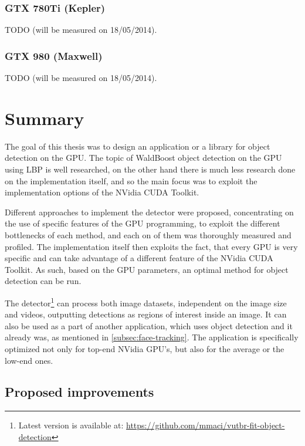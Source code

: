 \clearpage

\subsection{GTX 780Ti (Kepler)}

TODO (will be measured on 18/05/2014).

\subsection{GTX 980 (Maxwell)}

TODO (will be measured on 18/05/2014).

\chapter{Summary}

The goal of this thesis was to design an application or a library for object detection on the GPU. The topic of WaldBoost object detection on the GPU using LBP is well researched, on the other hand there is much less research done on the implementation itself, and so the main focus was to exploit the implementation options of the NVidia CUDA Toolkit.

Different approaches to implement the detector were proposed, concentrating on the use of specific features of the GPU programming, to exploit the different bottlenecks of each method, and each on of them was thoroughly measured and profiled. The implementation itself then exploits the fact, that every GPU is very specific and can take advantage of a different feature of the NVidia CUDA Toolkit. As such, based on the GPU parameters, an optimal method for object detection can be run.

The detector\footnote{Latest version is available at: \url{https://github.com/mmaci/vutbr-fit-object-detection}} can process both image datasets, independent on the image size and videos, outputting detections as regions of interest inside an image. It can also be used as a part of another application, which uses object detection and it already was, as mentioned in \ref{subsec:face-tracking}. The application is specifically optimized not only for top-end NVidia GPU's, but also for the average or the low-end ones.

\section{Proposed improvements}

